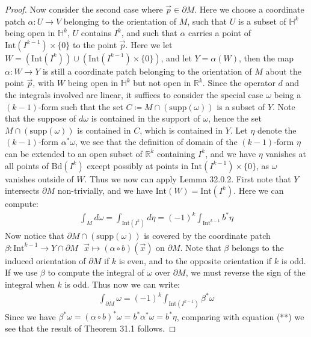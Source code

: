 \documentclass[11pt,oneside]{book}
\theoremstyle{break}
\theoremstyle{break}
\newcommand{\R}{\mathbb{R}}
\newcommand{\Int}{\text{Int}}
\newcommand{\supp}{\text{supp}}
\newcommand{\Bd}{\text{Bd}}
\begin{document}
\begin{proof}
Now consider the second case where $\vec{p}\in \partial M$. Here we choose a coordinate patch $\alpha:U \to V$ belonging to the orientation of $M$, such that $U$ is a subset of $\mathbb{H}^k$ being open in $\mathbb{H}^k$, $U$ contains $I^k$, and such that $\alpha$ carries a point of $\Int(I^{k-1}) \times \{0\}$ to the point $\vec{p}$. Here we let $W = (\Int(I^k))\cup (\Int(I^{k-1}) \times \{0\})$, and let $Y = \alpha(W)$, then the map $\alpha:W \to Y$ is still a coordinate patch belonging to the orientation of $M$ about the point $\vec{p}$, with $W$ being open in $\mathbb{H}^k$ but not open in $\R^k$. Since the operator $d$ and the integrals involved are linear, it suffices to consider the special case $\omega$ being a $(k-1)$-form such that the set $C\coloneqq M\cap (\supp(\omega))$ is a subset of $Y$. Note that the suppose of $d\omega$ is contained in the support of $\omega$, hence the set $M\cap (\supp(\omega))$ is contained in $C$, which is contained in $Y$. Let $\eta$ denote the $(k-1)$-form $\alpha^*\omega$, we see that the definition of domain of the $(k-1)$-form $\eta$ can be extended to an open subset of $\R^k$ containing $I^k$, and we have $\eta$ vanishes at all points of $\Bd(I^k)$ except possibly at points in $\Int(I^{k-1})\times \{0\}$, as $\omega$ vanishes outside of $W$. Thus we now can apply Lemma 32.0.2. First note that $Y$ intersects $\partial M$ non-trivially, and we have $\Int(W) = \Int(I^k)$. Here we can compute:
\begin{align*}
\int_M d \omega = \int_{\Int(I^k)} d\eta = (-1)^k \int_{\Int^{k-1}} b^*\eta \tag{**}
\end{align*}
Now notice that $\partial M \cap (\supp(\omega))$ is covered by the coordinate patch $\beta: \Int^{k-1}\to Y \cap \partial M \ \ \ \vec{x}\mapsto (\alpha\circ b)(\vec{x})$ on $\partial M$. Note that $\beta$ belongs to the induced orientation of $\partial M$ if $k$ is even, and to the opposite orientation if $k$ is odd. If we use $\beta$ to compute the integral of $\omega$ over $\partial M$, we must reverse the sign of the integral when $k$ is odd. Thus now we can write:
\begin{align*}
\int_{\partial M} \omega = (-1)^k \int_{\Int(I^{k-1})} \beta^*\omega
\end{align*}
Since we have $\beta^*\omega = (\alpha \circ b)^* \omega = b^*\alpha^*\omega = b^*\eta$, comparing with equation (**) we see that the result of Theorem 31.1 follows.
\end{proof}
\end{document}

